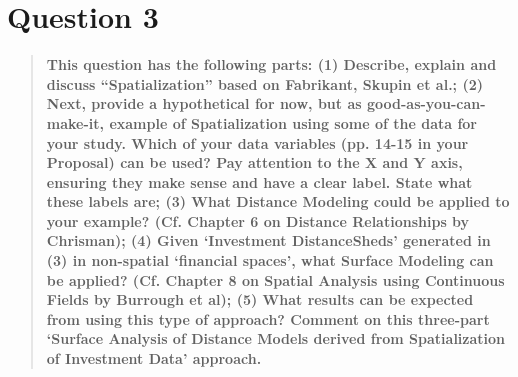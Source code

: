\documentclass[12pt,letterpaper,notitlepage,onecolumn,final,openbib]{article}
\begin{document}
\section{Question 3}
\begin{quotation}
	\textbf{This question has the following parts: (1) Describe, explain and discuss ``Spatialization'' based on Fabrikant, Skupin et al.; (2) Next, provide a hypothetical for now, but as good-as-you-can-make-it, example of Spatialization using	some of the data for your study. Which of your data variables (pp. 14-15 in your Proposal) can be used? Pay attention to the X and Y axis, ensuring they make sense and have a clear label. State what these labels are; (3) What Distance Modeling could be applied to your example? (Cf. Chapter 6 on Distance Relationships by Chrisman); (4) Given `Investment DistanceSheds' generated in (3) in non-spatial `financial spaces', what Surface Modeling can be applied? (Cf. Chapter 8 on Spatial Analysis using Continuous Fields by Burrough et al); (5) What results can be expected from using this type of approach? Comment on this three-part `Surface Analysis of Distance Models derived from Spatialization of Investment Data' approach.}
\end{quotation}

\subsection{}
\subsection{}
\subsection{}
\subsection{}
\subsection{}


	\pagebreak
	
	
\end{document}

